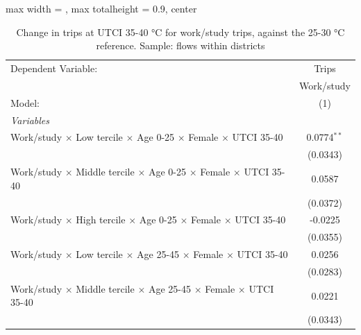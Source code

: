 
\begin{table}[htbp]
   \caption{\label{table_intersectionality_work_or_study_35-40} Change in trips at UTCI 35-40 °C for work/study trips, against the 25-30 °C reference. Sample: flows within districts}
   \centering
   \small
   \begin{adjustbox}{max width = \textwidth, max totalheight = 0.9\textheight, center}
      \begin{tabular}{lc}
         \tabularnewline \midrule \midrule
         Dependent Variable:                                                                            & Trips\\  
                                                                                                        & Work/study \\   
         Model:                                                                                         & (1)\\  
         \midrule
         \emph{Variables}\\
         Work/study $\times$ Low tercile $\times$ Age 0-25 $\times$ Female $\times$ UTCI 35-40          & 0.0774$^{**}$\\   
                                                                                                        & (0.0343)\\   
         Work/study $\times$ Middle tercile $\times$ Age 0-25 $\times$ Female $\times$ UTCI 35-40       & 0.0587\\   
                                                                                                        & (0.0372)\\   
         Work/study $\times$ High tercile $\times$ Age 0-25 $\times$ Female $\times$ UTCI 35-40         & -0.0225\\   
                                                                                                        & (0.0355)\\   
         Work/study $\times$ Low tercile $\times$ Age 25-45 $\times$ Female $\times$ UTCI 35-40         & 0.0256\\   
                                                                                                        & (0.0283)\\   
         Work/study $\times$ Middle tercile $\times$ Age 25-45 $\times$ Female $\times$ UTCI 35-40      & 0.0221\\   
                                                                                                        & (0.0343)\\   

\end{tabular}
\end{adjustbox}
\end{table}

